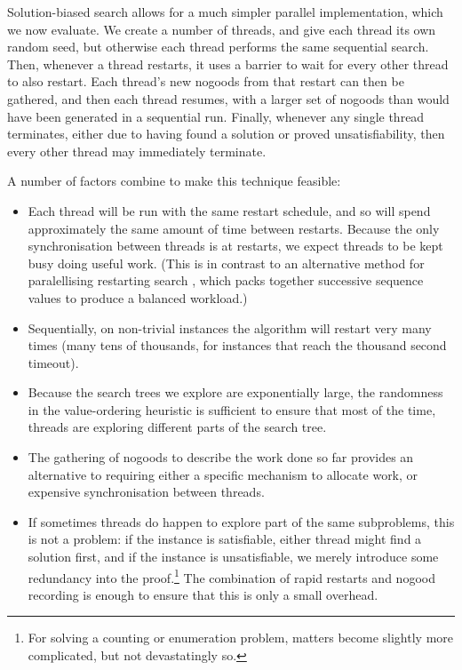 \documentclass[runningheads]{llncs}
\begin{document}
Solution-biased search allows for a much simpler parallel implementation, which we now evaluate.  We
create a number of threads, and give each thread its own random seed, but otherwise each thread
performs the same sequential search. Then, whenever a thread restarts, it uses a barrier to wait for
every other thread to also restart. Each thread's new nogoods from that restart can then be
gathered, and then each thread resumes, with a larger set of nogoods than would have been generated
in a sequential run. Finally, whenever any single thread terminates, either due to having found a
solution or proved unsatisfiability, then every other thread may immediately terminate.

A number of factors combine to make this technique feasible:

\begin{itemize}
    \item Each thread will be run with the same restart schedule, and so will spend approximately
        the same amount of time between restarts. Because the only synchronisation between threads
        is at restarts, we expect threads to be kept busy doing useful work.  (This is in contrast
        to an alternative method for paralellising restarting search \cite{DBLP:conf/aaai/CireKS14},
        which packs together successive sequence values to produce a balanced workload.)
    \item Sequentially, on non-trivial instances the algorithm will restart very many times (many
        tens of thousands, for instances that reach the thousand second timeout).
    \item Because the search trees we explore are exponentially large, the randomness in the
        value-ordering heuristic is sufficient to ensure that most of the time, threads are
        exploring different parts of the search tree.
    \item The gathering of nogoods to describe the work done so far provides an alternative to
        requiring either a specific mechanism to allocate work, or expensive synchronisation between threads.
    \item If sometimes threads do happen to explore part of
        the same subproblems, this is not a problem: if the instance is satisfiable, either thread
        might find a solution first, and if the instance is unsatisfiable, we merely introduce some
        redundancy into the proof.\footnote{For solving a counting or enumeration problem,
        matters become slightly more complicated, but not devastatingly so.} The combination of
        rapid restarts and nogood recording is enough to ensure that this is only a small overhead.
\end{itemize}
\end{document}
